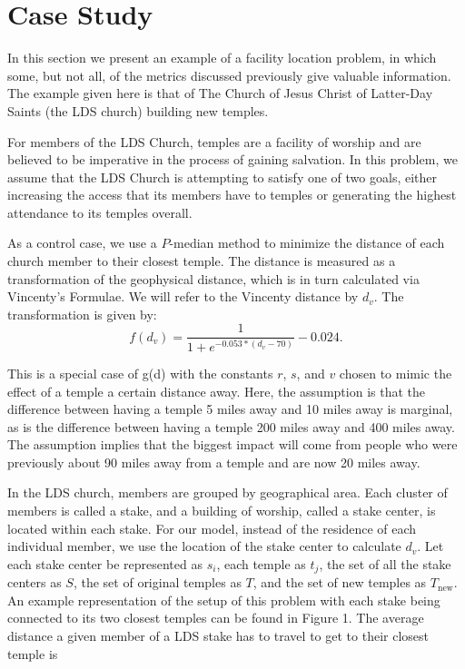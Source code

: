 \documentclass[twoside,twocolumn]{article}
\begin{document}
\section{Case Study}

In this section we present an example of a facility location problem, in which some, but not all, of the metrics discussed previously give valuable information. 
The example given here is that of The Church of Jesus Christ of Latter-Day Saints (the LDS church) building new temples.


For members of the LDS Church, temples are a facility of worship and are believed to be imperative in the process of gaining salvation.
In this problem, we assume that the LDS Church is attempting to satisfy one of two goals, either increasing the access that its members have to temples or generating the highest attendance to its temples overall.

As a control case, we use a $P$-median method to minimize the distance of each church member to their closest temple.
The distance is measured as a transformation of the geophysical distance, which is in turn calculated via Vincenty's Formulae. %
We will refer to the Vincenty distance by $d_{v}$. %
The transformation is given by:
\begin{equation}
f(d_{v}) = \frac{1}{1+e^{-0.053*(d_{v} - 70)}} - 0.024.
\end{equation}

This is a special case of g(d) with the constants $r$, $s$, and $v$ chosen to mimic the effect of a temple a certain distance away.
Here, the assumption is that the difference between having a temple 5 miles away and 10 miles away is marginal, as is the difference between having a temple 200 miles away and 400 miles away.
The assumption implies that the biggest impact will come from people who were previously about 90 miles away from a temple and are now 20 miles away.

In the LDS church, members are grouped by geographical area.
Each cluster of members is called a stake, and a building of worship, called a stake center, is located within each stake.
For our model, instead of the residence of each individual member, we use the location of the stake center to calculate $d_{v}$.
Let each stake center be represented as $s_i$, each temple as $t_j$, the set of all the stake centers as $S$, the set of original temples as $T$, and the set of new temples as $T_{\text{new}}$. %
An example representation of the setup of this problem with each stake being connected to its two closest temples can be found in Figure 1.
The average distance a given member of a LDS stake has to travel to get to their closest temple is
\end{document}
